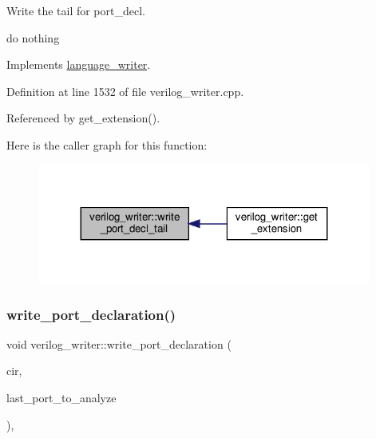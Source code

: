 Write the tail for port\+\_\+decl. 

do nothing 

Implements \hyperlink{classlanguage__writer_af20577675f401b5e75b4f0a64484529b}{language\+\_\+writer}.



Definition at line 1532 of file verilog\+\_\+writer.\+cpp.



Referenced by get\+\_\+extension().

Here is the caller graph for this function\+:
\nopagebreak
\begin{figure}[H]
\begin{center}
\leavevmode
\includegraphics[width=311pt]{d8/dba/classverilog__writer_adb76a5b50df9958409d5bde95d2dae79_icgraph}
\end{center}
\end{figure}
\mbox{\label{classverilog__writer_a1b1655ecdaf1a37e7b9cf5dca23b8219}} 
\subsubsection{\texorpdfstring{write\+\_\+port\+\_\+declaration()}{write\_port\_declaration()}}
{\footnotesize\ttfamily void verilog\+\_\+writer\+::write\+\_\+port\+\_\+declaration (\begin{DoxyParamCaption}\item[{const \hyperlink{structural__objects_8hpp_a8ea5f8cc50ab8f4c31e2751074ff60b2}{structural\+\_\+object\+Ref} \&}]{cir,  }\item[{bool}]{last\+\_\+port\+\_\+to\+\_\+analyze }\end{DoxyParamCaption})\hspace{0.3cm}{\ttfamily [override]}, {\ttfamily [virtual]}}



